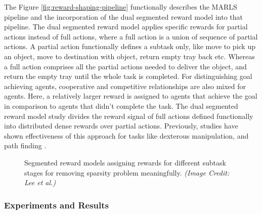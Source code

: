 \documentclass{article}
\begin{document}
The Figure \ref{fig:reward-shaping-pipeline} functionally describes the MARLS pipeline and the incorporation of the dual segmented reward model into that pipeline.
The dual segmented reward model applies specific rewards for partial actions instead of full actions, where a full action is a union of sequence of partial actions.
A partial action functionally defines a subtask only, like move to pick up an object, move to destination with object, return empty tray back etc.
Whereas a full action comprises all the partial actions needed to deliver the object, and return the empty tray until the whole task is completed.
For distinguishing goal achieving agents, cooperative and competitive relationships are also mixed for agents.
Here, a relatively larger reward is assigned to agents that achieve the goal in comparison to agents that didn’t complete the task.
The dual segmented reward model study divides the reward signal of full actions defined functionally into distributed dense rewards over partial actions.
Previously, studies have shown effectiveness of this approach for tasks like dexterous manipulation, and path finding \cite{gudimella2017deep, sartoretti2019primal}.



\begin{figure}[!tbp]
  \centering
  \hfill
  \caption{Segmented reward models assigning rewards for different subtask stages for removing sparsity problem meaningfully. \textit{(Image Credit: Lee et al.)}}
\end{figure}


\subsubsection{Experiments and Results}
\end{document}
